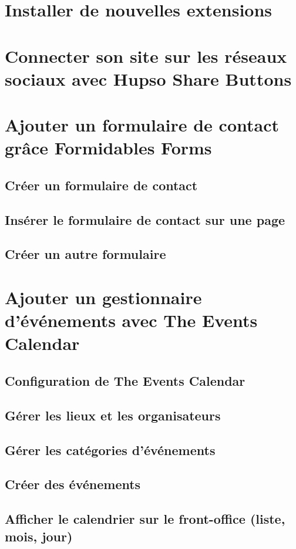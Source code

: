 \documentclass[10pt,a4paper]{article}
\begin{document}
\section{Installer de nouvelles extensions}
\newpage
\section{Connecter son site sur les réseaux sociaux avec Hupso Share Buttons}
\newpage
\section{Ajouter un formulaire de contact grâce Formidables Forms}
\subsection{Créer un formulaire de contact}
\subsection{Insérer le formulaire de contact sur une page}
\subsection{Créer un autre formulaire}
\newpage
\section{Ajouter un gestionnaire d'événements avec The Events Calendar}
\subsection{Configuration de The Events Calendar}
\subsection{Gérer les lieux et les organisateurs}
\subsection{Gérer les catégories d'événements}
\subsection{Créer des événements}
\subsection{Afficher le calendrier sur le front-office (liste, mois, jour)}
\newpage
\end{document}
